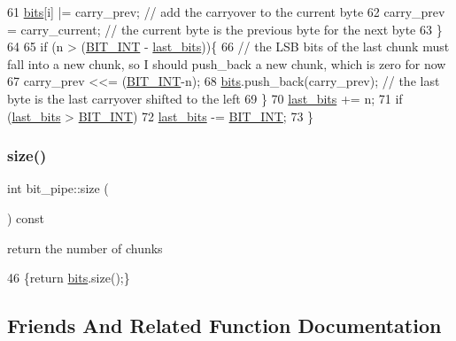\begin{DoxyCode}
61     \hyperlink{classbit__pipe_a86f38af1e9736b053728033490476b50}{bits}[i] |= carry\_prev; \textcolor{comment}{// add the carryover to the current byte}
62     carry\_prev = carry\_current; \textcolor{comment}{// the current byte is the previous byte for the next byte}
63   \}
64     
65   \textcolor{keywordflow}{if} (n > (\hyperlink{bitstream_8h_afcadf5aa65c5159bfb96c4d82ebc0a5d}{BIT\_INT} - \hyperlink{classbit__pipe_a0f3e84b02751803adaab499b5dad86fe}{last\_bits}))\{
66     \textcolor{comment}{// the LSB bits of the last chunk must fall into a new chunk, so I should push\_back a new chunk, which
       is zero for now}
67     carry\_prev <<= (\hyperlink{bitstream_8h_afcadf5aa65c5159bfb96c4d82ebc0a5d}{BIT\_INT}-n);
68     \hyperlink{classbit__pipe_a86f38af1e9736b053728033490476b50}{bits}.push\_back(carry\_prev); \textcolor{comment}{// the last byte is the last carryover shifted to the left }
69   \}
70   \hyperlink{classbit__pipe_a0f3e84b02751803adaab499b5dad86fe}{last\_bits} += n;
71   \textcolor{keywordflow}{if} (\hyperlink{classbit__pipe_a0f3e84b02751803adaab499b5dad86fe}{last\_bits} > \hyperlink{bitstream_8h_afcadf5aa65c5159bfb96c4d82ebc0a5d}{BIT\_INT})
72     \hyperlink{classbit__pipe_a0f3e84b02751803adaab499b5dad86fe}{last\_bits} -= \hyperlink{bitstream_8h_afcadf5aa65c5159bfb96c4d82ebc0a5d}{BIT\_INT};
73 \}
\end{DoxyCode}
\mbox{\label{classbit__pipe_a4bdc57f1f598bfad0eaa40860f17000c}} 
\subsubsection{\texorpdfstring{size()}{size()}}
{\footnotesize\ttfamily int bit\+\_\+pipe\+::size (\begin{DoxyParamCaption}{ }\end{DoxyParamCaption}) const\hspace{0.3cm}{\ttfamily [inline]}}



return the number of chunks 


\begin{DoxyCode}
46 \{\textcolor{keywordflow}{return} \hyperlink{classbit__pipe_a86f38af1e9736b053728033490476b50}{bits}.size();\}
\end{DoxyCode}


\subsection{Friends And Related Function Documentation}
\mbox{\label{classbit__pipe_ad424cca57ffb12b4cd748da4dcfe7b41}} 
